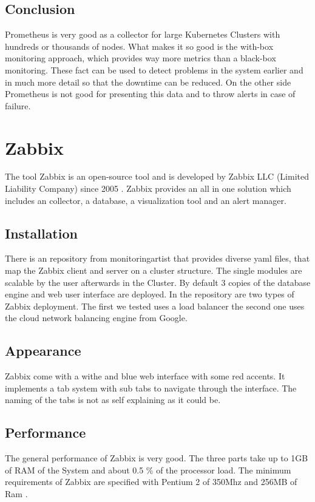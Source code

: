 \subsection{Conclusion}
Prometheus is very good as a collector for large Kubernetes Clusters with hundreds or thousands of nodes. What makes it so good is the with-box monitoring approach, which provides way more metrics than a black-box monitoring. These fact can be used to detect problems in the system earlier and in much more detail so that the downtime can be reduced. On the other side Prometheus is not good for presenting this data and to throw alerts in case of failure.

\section{Zabbix}
\label{Zabbix} %
\cite{Hernantes2015}
The tool Zabbix is an open-source tool and is developed by Zabbix LLC (Limited Liability Company) since 2005 \cite{zabbix}. Zabbix provides an all in one solution which includes an collector, a database, a visualization tool and an alert manager.
\subsection{Installation}
There is an repository from monitoringartist \cite{zabbix_kube} that provides diverse yaml files, that map the Zabbix client and server on a cluster structure. The single modules are scalable by the user afterwards in the Cluster. By default 3 copies of the database engine and web user interface are deployed. In the repository are two types of Zabbix deployment. The first we tested uses a load balancer the second one uses the cloud network balancing engine from Google.
\subsection{Appearance}%
Zabbix come with a withe and blue web interface with some red accents. It implements a tab system with sub tabs to navigate through the interface. The naming of the tabs is not as self explaining as it could be.  
\subsection{Performance}
The general performance of Zabbix is very good. The three parts take up to 1GB of RAM of the System and about 0.5 \% of the processor load. The minimum requirements of Zabbix are specified with Pentium 2 of 350Mhz and 256MB of Ram \cite{Marik2014}.
